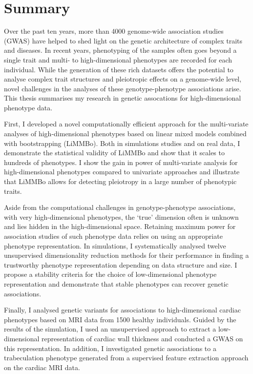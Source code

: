\clearpage
\chapter*{Summary}
\label{section:summary}

\begin{singlespace}
Over the past ten years, more than \num{4000} genome-wide association studies (GWAS) have helped to shed light on the genetic architecture of complex traits and diseases.   In recent years, phenotyping of the samples often goes beyond a single trait and multi- to high-dimensional phenotypes are recorded for each individual. While the generation of these rich datasets offers the potential to analyse complex trait structures and pleiotropic effects on a genome-wide level, novel challenges in the analyses of these genotype-phenotype associations arise. This thesis summarises my research in genetic assocations for high-dimensional phenotype data.

First, I developed a novel computationally efficient approach for the multi-variate analyses of high-dimensional phenotypes based on linear mixed models combined with bootstrapping (LiMMBo). Both in simulations studies and on real data, I demonstrate the statistical validity of LiMMBo and show that it scales to hundreds of phenotypes. I show the gain in power of multi-variate analysis for high-dimensional phenotypes compared to univariate approaches and illustrate that LiMMBo allows for detecting pleiotropy in a large number of phenotypic traits. 

Aside from the computational challenges in genotype-phenotype associations, with very high-dimensional phenotypes, the `true' dimension often is unknown and lies hidden in the high-dimensional space. Retaining maximum power for association studies of such phenotype data relies on using an appropriate phenotype representation.  In simulations, I systematically analysed twelve unsupervised dimensionality reduction methods for their performance in finding a trustworthy phenotype representation depending on data structure and size. I propose a stability criteria for the choice of low-dimensional phenotype representation and demonstrate that stable phenotypes can recover genetic associations. 

Finally, I analysed genetic variants for associations to high-dimensional cardiac phenotypes based on MRI data from \num{1500} healthy individuals. Guided by the results of the simulation, I used an unsupervised approach to extract a low-dimensional representation of cardiac wall thickness and conducted a GWAS on this representation. In addition, I investigated genetic associations to a trabeculation phenotype generated from a supervised feature extraction approach on the cardiac MRI data.


\end{singlespace}
